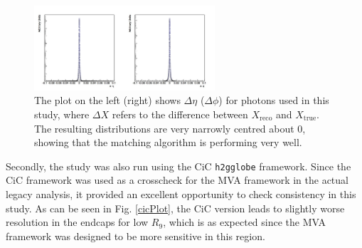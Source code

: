 \documentclass[10pt]{article}
\begin{document}
\begin{figure}[h!]
 \centering
\includegraphics[width=0.6\textwidth]{"Delta"}
\caption{ The plot on the left (right) shows $\Delta \eta$ ($\Delta \phi$) for photons used in this study, where $\Delta X$ refers to the difference between $X_{\text{reco}}$ and $X_{\text{true}}$. The resulting distributions are very narrowly centred about 0, showing that the matching algorithm is performing very well.} %
\label{deltaPlots}
\end{figure}
Secondly, the study was also run using the CiC \texttt{h2gglobe} framework. Since the CiC framework was used as a crosscheck for the MVA framework in the actual legacy analysis, it provided an excellent opportunity to check consistency in this study. As can be seen in Fig. \ref{cicPlot}, the CiC version leads to slightly worse resolution in the endcaps for low $R_9$, which is as expected since the MVA framework was designed to be more sensitive in this region.
\end{document}
